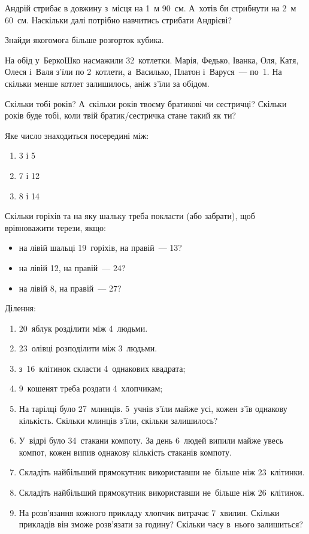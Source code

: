 \problem
Андрій стрибає в довжину з~місця на 1~м 90~см.
А~хотів би стрибнути на 2~м 60~см.
Наскільки далі потрібно навчитись стрибати Андрієві?


\problem
Знайди якогомога більше розгорток кубика.


\problem
На обід у~БеркоШко насмажили 32~котлетки.
Марія, Федько, Іванка, Оля, Катя, Олеся і~Валя з’їли по 2~котлети,
а~Василько, Платон і~Варуся~--- по~1.
На скільки менше котлет залишилось, аніж з’їли за обідом.


\problem
Скільки тобі років?
А~скільки років твоєму братикові чи сестричці?
Скільки років буде тобі, коли твій братик/сестричка стане такий як ти?


\problem
Яке число знаходиться посередині між:
\begin{multicols}{3}
    \begin{enumerate}
        \item 3 і 5
        \item 7 і  12
        \item 8 і 14
    \end{enumerate}
\end{multicols}


\problem
Скільки горіхів та на яку шальку треба покласти (або забрати),
щоб врівноважити терези, якщо:
\begin{itemize}
    \item на лівій шальці 19~горіхів, на правій~--- 13?
    \item на лівій 12, на правій~--- 24?
    \item на лівій 8, на правій~--- 27?
\end{itemize}


\problem
Ділення:
\begin{enumerate}
    \item 20~яблук розділити між 4~людьми.
    \item 23~олівці розподілити між 3~людьми.
    \item з~16~клітинок скласти 4~однакових квадрата;
    \item 9~кошенят треба роздати 4~хлопчикам;
    \item На тарілці було 27~млинців. 5~учнів з'їли майже усі,
    кожен з'їв однакову кількість.
    Скільки млинців з'їли, скільки залишилось?
    \item У~відрі було 34~стакани компоту.
    За день 6~людей випили майже увесь компот,
    кожен випив однакову кількість стаканів компоту.
    \item Складіть найбільший прямокутник використавши
    не~більше ніж 23~клітинки.
    \item Складіть найбільший прямокутник використавши
    не~більше ніж 26~клітинок.
    \item На розв'язання кожного прикладу хлопчик витрачає 7~хвилин.
    Скільки прикладів він зможе розв'язати за годину?
    Скільки часу в~нього залишиться?
\end{enumerate}


